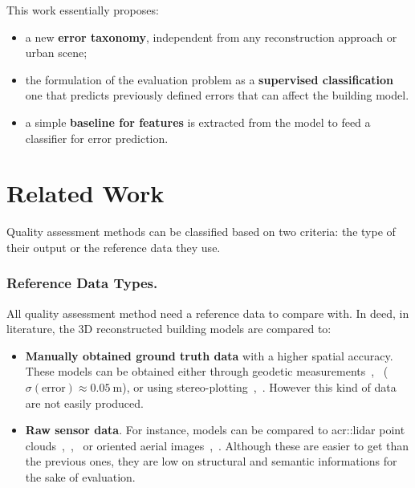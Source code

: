 \documentclass[runningheads]{llncs}
\begin{document}
    This work essentially proposes:
    \begin{itemize}
        \item a new \textbf{error taxonomy}, independent from any reconstruction approach or urban scene;
        \item the formulation of the evaluation problem as a \textbf{supervised classification} one that predicts previously defined errors that can affect the building model.
        \item a simple \textbf{baseline for features} is extracted from the model to feed a classifier for error prediction.
    \end{itemize}
\section{Related Work}

Quality assessment methods can be classified based on two criteria: the type of their output or the reference data they use.
\subsubsection{Reference Data Types.}
All quality assessment method need a reference data to compare with. In deed, in literature, the 3D reconstructed building models are compared to:
\begin{itemize}
    \item \textbf{Manually obtained ground truth data} with a higher spatial accuracy. These models can be obtained either through geodetic measurements~\cite{Kaartinen2005},~\cite{Voegtle2003} ($\sigma(\text{error}) \approx \SI{0.05}{\meter}$), or using stereo-plotting~\cite{Kaartinen2005},~\cite{Zeng2014}. However this kind of data are not easily produced.
    \item \textbf{Raw sensor data}. For instance, models can be compared to \acrfull{acr::lidar} point clouds~\cite{Akca2010},~\cite{Lafarge2012},~\cite{li2016boxfitting} or oriented aerial images~\cite{boudet2006supervised},~\cite{Michelin2013}. Although these are easier to get than the previous ones, they are low on structural and semantic informations for the sake of evaluation.
\end{itemize}
\end{document}
